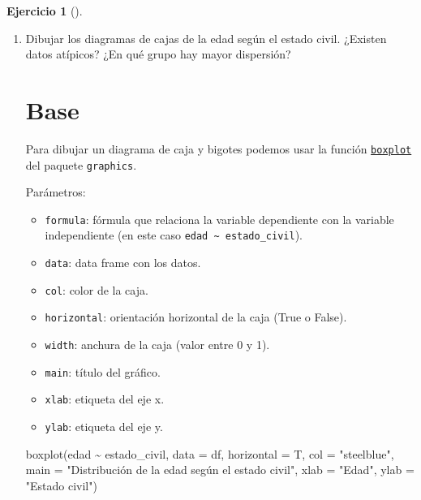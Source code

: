 \documentclass[
  a4paper,
]{scrreport}
\newenvironment{Shaded}{\begin{snugshade}}{\end{snugshade}}
\newcommand{\AttributeTok}[1]{\textcolor[rgb]{0.40,0.45,0.13}{#1}}
\newcommand{\FunctionTok}[1]{\textcolor[rgb]{0.28,0.35,0.67}{#1}}
\newcommand{\NormalTok}[1]{\textcolor[rgb]{0.00,0.23,0.31}{#1}}
\newcommand{\SpecialCharTok}[1]{\textcolor[rgb]{0.37,0.37,0.37}{#1}}
\newcommand{\StringTok}[1]{\textcolor[rgb]{0.13,0.47,0.30}{#1}}
\providecommand{\tightlist}{%
  \setlength{\itemsep}{0pt}\setlength{\parskip}{0pt}}\usepackage{longtable,booktabs,array}
\theoremstyle{definition}
\newtheorem{exercise}{Ejercicio}[chapter]
\theoremstyle{remark}
\begin{document}
\begin{exercise}[]
\begin{enumerate}
\begin{tcolorbox}
  \end{tcolorbox}
\item
  Dibujar los diagramas de cajas de la edad según el estado civil.
  ¿Existen datos atípicos? ¿En qué grupo hay mayor dispersión?

  \begin{tcolorbox}[enhanced jigsaw, colframe=quarto-callout-tip-color-frame, toprule=.15mm, bottomtitle=1mm, breakable, opacitybacktitle=0.6, toptitle=1mm, colback=white, bottomrule=.15mm, title=\textcolor{quarto-callout-tip-color}{\faLightbulb}\hspace{0.5em}{Solución}, arc=.35mm, left=2mm, titlerule=0mm, rightrule=.15mm, coltitle=black, leftrule=.75mm, opacityback=0, colbacktitle=quarto-callout-tip-color!10!white]

  \section{Base}

  Para dibujar un diagrama de caja y bigotes podemos usar la función
  \href{https://www.rdocumentation.org/packages/graphics/versions/3.6.2/topics/boxplot}{\texttt{boxplot}}
  del paquete \texttt{graphics}.

  Parámetros:

  \begin{itemize}
  \tightlist
  \item
    \texttt{formula}: fórmula que relaciona la variable dependiente con
    la variable independiente (en este caso
    \texttt{edad\ \textasciitilde{}\ estado\_civil}).
  \item
    \texttt{data}: data frame con los datos.
  \item
    \texttt{col}: color de la caja.
  \item
    \texttt{horizontal}: orientación horizontal de la caja (True o
    False).
  \item
    \texttt{width}: anchura de la caja (valor entre 0 y 1).
  \item
    \texttt{main}: título del gráfico.
  \item
    \texttt{xlab}: etiqueta del eje x.
  \item
    \texttt{ylab}: etiqueta del eje y.
  \end{itemize}

\begin{Shaded}
\begin{Highlighting}[]
\FunctionTok{boxplot}\NormalTok{(edad }\SpecialCharTok{\textasciitilde{}}\NormalTok{ estado\_civil, }\AttributeTok{data =}\NormalTok{ df, }\AttributeTok{horizontal =}\NormalTok{ T, }\AttributeTok{col =} \StringTok{"steelblue"}\NormalTok{, }\AttributeTok{main =} \StringTok{"Distribución de la edad según el estado civil"}\NormalTok{, }\AttributeTok{xlab =} \StringTok{"Edad"}\NormalTok{, }\AttributeTok{ylab =} \StringTok{"Estado civil"}\NormalTok{)}
\end{Highlighting}
\end{Shaded}


\end{tcolorbox}
\end{enumerate}
\end{exercise}
\end{document}
